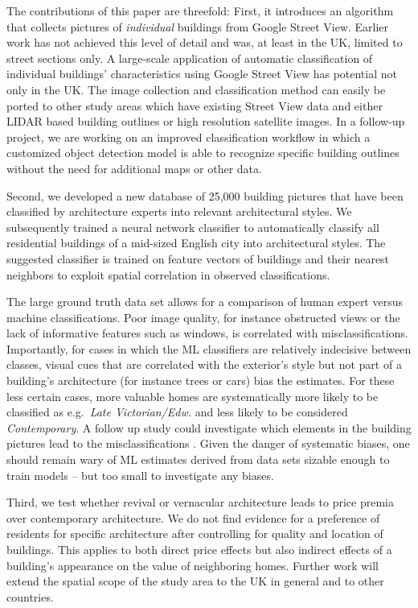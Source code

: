 \documentclass[]{article}
\begin{document}
The contributions of this paper are threefold: First, it introduces an
algorithm that collects pictures of \emph{individual} buildings from
Google Street View. Earlier work has not achieved this level of detail
and was, at least in the UK, limited to street sections only. A
large-scale application of automatic classification of individual
buildings' characteristics using Google Street View has potential not
only in the UK. The image collection and classification method can
easily be ported to other study areas which have existing Street View
data and either LIDAR based building outlines or high resolution
satellite images. In a follow-up project, we are working on an improved
classification workflow in which a customized object detection model is
able to recognize specific building outlines without the need for
additional maps or other data.

Second, we developed a new database of 25,000 building pictures that
have been classified by architecture experts into relevant architectural
styles. We subsequently trained a neural network classifier to
automatically classify all residential buildings of a mid-sized English
city into architectural styles. The suggested classifier is trained on
feature vectors of buildings and their nearest neighbors to exploit
spatial correlation in observed classifications.

The large ground truth data set allows for a comparison of human expert
versus machine classifications. Poor image quality, for instance
obstructed views or the lack of informative features such as windows, is
correlated with misclassifications. Importantly, for cases in which the
ML classifiers are relatively indecisive between classes, visual cues
that are correlated with the exterior's style but not part of a
building's architecture (for instance trees or cars) bias the estimates.
For these less certain cases, more valuable homes are systematically
more likely to be classified as e.g.~\emph{Late Victorian/Edw.} and less
likely to be considered \emph{Contemporary}. A follow up study could
investigate which elements in the building pictures lead to the
misclassifications \autocite{Ribeiro2016}. Given the danger of
systematic biases, one should remain wary of ML estimates derived from
data sets sizable enough to train models -- but too small to investigate
any biases.

Third, we test whether revival or vernacular architecture leads to price
premia over contemporary architecture. We do not find evidence for a
preference of residents for specific architecture after controlling for
quality and location of buildings. This applies to both direct price
effects but also indirect effects of a building's appearance on the
value of neighboring homes. Further work will extend the spatial scope
of the study area to the UK in general and to other countries.
\end{document}
